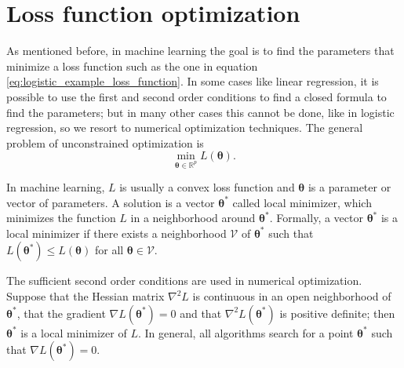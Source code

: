
\section{Loss function optimization}

As mentioned before, in machine learning the goal is to find the parameters that minimize a loss function such as the one in equation \eqref{eq:logistic_example_loss_function}. In some cases like linear regression, it is possible to use the first and second order conditions to find a closed formula to find the parameters; but in many other cases this cannot be done, like in logistic regression, so we resort to numerical optimization techniques. The general problem of unconstrained optimization \cite{nocedal2006numerical} is
\begin{equation}
  \min_{\boldsymbol{\theta} \in \mathbb{R}^p} L(\boldsymbol{\theta}).
\end{equation}

In machine learning, $L$ is usually a convex loss function and $\boldsymbol{\theta}$ is a parameter or vector of parameters. A solution is a vector $\boldsymbol{\theta}^*$ called local minimizer, which minimizes the function $L$ in a neighborhood around $\boldsymbol{\theta}^*$. Formally, a vector $\boldsymbol{\theta}^*$ is a local minimizer if there exists a neighborhood $\mathcal{V}$ of $\boldsymbol{\theta}^*$ such that $L(\boldsymbol{\theta}^*) \leq L(\boldsymbol{\theta})$ for all $\boldsymbol{\theta} \in \mathcal{V}$.

The sufficient second order conditions are used in numerical optimization. Suppose that the Hessian matrix $\nabla^2 L$ is continuous in an open neighborhood of $\boldsymbol{\theta}^*$, that the gradient $\nabla L(\boldsymbol{\theta}^*) = 0$ and that $\nabla^2 L(\boldsymbol{\theta}^*)$ is positive definite; then $\boldsymbol{\theta}^*$ is a local minimizer of $L$. In general, all algorithms search for a point $\boldsymbol{\theta}^*$ such that $\nabla L(\boldsymbol{\theta}^*) = 0$.

